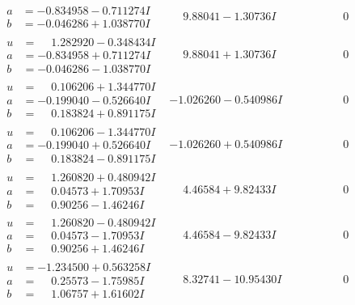 \documentclass[1p]{elsarticle_modified}
\theoremstyle{definition}
\begin{document}
$$\begin{array}{c|c|c}
\begin{aligned}
a &= -0.834958 - 0.711274 I \\
b &= -0.046286 + 1.038770 I\end{aligned}
 & \phantom{-}9.88041 - 1.30736 I & \phantom{-0.000000 } 0 \\ \hline\begin{aligned}
u &= \phantom{-}1.282920 - 0.348434 I \\
a &= -0.834958 + 0.711274 I \\
b &= -0.046286 - 1.038770 I\end{aligned}
 & \phantom{-}9.88041 + 1.30736 I & \phantom{-0.000000 } 0 \\ \hline\begin{aligned}
u &= \phantom{-}0.106206 + 1.344770 I \\
a &= -0.199040 - 0.526640 I \\
b &= \phantom{-}0.183824 + 0.891175 I\end{aligned}
 & -1.026260 - 0.540986 I & \phantom{-0.000000 } 0 \\ \hline\begin{aligned}
u &= \phantom{-}0.106206 - 1.344770 I \\
a &= -0.199040 + 0.526640 I \\
b &= \phantom{-}0.183824 - 0.891175 I\end{aligned}
 & -1.026260 + 0.540986 I & \phantom{-0.000000 } 0 \\ \hline\begin{aligned}
u &= \phantom{-}1.260820 + 0.480942 I \\
a &= \phantom{-}0.04573 + 1.70953 I \\
b &= \phantom{-}0.90256 - 1.46246 I\end{aligned}
 & \phantom{-}4.46584 + 9.82433 I & \phantom{-0.000000 } 0 \\ \hline\begin{aligned}
u &= \phantom{-}1.260820 - 0.480942 I \\
a &= \phantom{-}0.04573 - 1.70953 I \\
b &= \phantom{-}0.90256 + 1.46246 I\end{aligned}
 & \phantom{-}4.46584 - 9.82433 I & \phantom{-0.000000 } 0 \\ \hline\begin{aligned}
u &= -1.234500 + 0.563258 I \\
a &= \phantom{-}0.25573 - 1.75985 I \\
b &= \phantom{-}1.06757 + 1.61602 I\end{aligned}
 & \phantom{-}8.32741 - 10.95430 I & \phantom{-0.000000 } 0 \\ \hline\begin{aligned}

\end{aligned}
\end{array}$$
\end{document}
